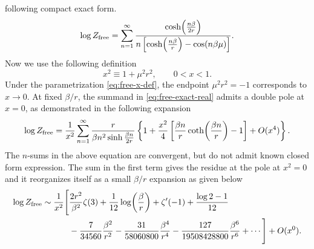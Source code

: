 \documentclass[a4paper,11pt]{article}
\newcommand{\appref}[1]{appendix~\ref{#1}}
\begin{document}
following compact exact form.  
\begin{equation}
 \log Z_{\rm free}
 =\sum_{n=1}^{\infty}
 \frac{\cosh\!\left(\frac{n\beta}{2r}\right)}
 {n\left[\cosh\!\left(\frac{n\beta}{r}\right)-\cos(n\beta\mu)\right]}.
 \label{eq:free-exact-real}
\end{equation}
 Now we use the following definition
\begin{equation}
 x^2\equiv 1+\mu^2r^2,
 \qquad
 0<x<1.
 \label{eq:free-x-def}
\end{equation}
Under the parametrization \eqref{eq:free-x-def}, the endpoint
$\mu^2r^2=-1$ corresponds to $x\to0$.  At fixed $\beta/r$, the 
summand in \eqref{eq:free-exact-real} admits a double pole at $x=0$, as demonstrated in the following expansion
\begin{equation}
 \log Z_{\rm free}
 =\frac{1}{x^2}\sum_{n=1}^{\infty}
 \frac{r}{\beta n^2\sinh\frac{\beta n}{2r}}
 \left\{
  1
  +\frac{x^2}4\left[
   \frac{\beta n}{r}\coth\!\left(\frac{\beta n}{r}\right)-1
  \right] +O(x^4)
 \right\}
.
 \label{eq:free-small-x-full}
\end{equation}
The $n$-sums in the above equation are convergent, but do not admit known closed form expression. The sum in the first term gives  the residue at the pole at $x^2=0$ and it reorganizes itself as a small $\beta/r$ expansion as given below
\begin{align}
 \log Z_{\rm free}
 \sim\frac{1}{x^2}\Bigg[{}&\frac{2r^2}{\beta^2}\zeta(3)
 +\frac{1}{12}\log\!\left(\frac{\beta}{r}\right)
 +\zeta'(-1)+\frac{\log2-1}{12}
 \nonumber\\
 &-\frac{7}{34560}\frac{\beta^2}{r^2}
 -\frac{31}{58060800}\frac{\beta^4}{r^4}
 -\frac{127}{19508428800}\frac{\beta^6}{r^6}
 +\cdots\Bigg]
 +O(x^0).
 \label{eq:free-summed-highT-few}
\end{align}
\end{document}
